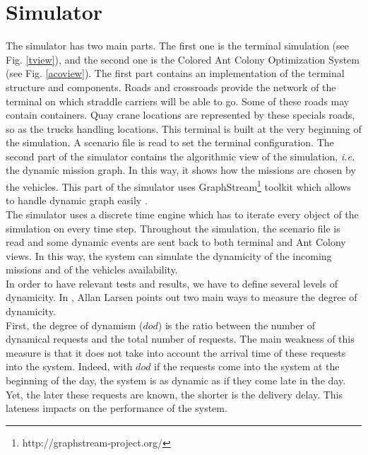 \documentclass[journal]{IEEEtran}
\begin{document}
\section{Simulator}
The simulator has two main parts. The first one is the terminal simulation (see
Fig. \ref{tview}), and the second one is the Colored Ant Colony Optimization
System (see Fig. \ref{acoview}).
The first part contains an implementation of the terminal structure and
components. Roads and crossroads provide the network of the terminal on which
straddle carriers will be able to go. Some of these roads may contain
containers. Quay crane locations are represented by these specials roads, so as
the trucks handling locations. This terminal is built at the very beginning of
the simulation. A scenario file is read to set the terminal configuration.
The second part of the simulator contains the algorithmic view of the
simulation, \textit{i.e.} the dynamic mission graph. In this way, it shows how
the missions are chosen by the vehicles. This part of the simulator uses
GraphStream\footnote{http://graphstream-project.org/} toolkit which allows to
handle dynamic graph easily \cite{Dutot2007}.\\

The simulator uses a discrete time engine which has to iterate every object of the
simulation on every time step. Throughout the simulation, the scenario file is
read and some dynamic events are sent back to both terminal and Ant Colony
views. In this way, the system can simulate the dynamicity %
of the incoming missions and of the vehicles availability.\\

In order to have relevant tests and results, we have to define several levels of
dynamicity. In \cite{larsen00}, Allan Larsen points out two main ways to measure the degree of dynamicity.\\

First, the degree of dynamism ($dod$) \cite{Lund96} is the ratio between
the number of dynamical requests and the total number of requests. The main weakness of this
measure is that it does not take  into account the arrival time of these
requests into the system. Indeed, with $dod$ if the requests come into the
system at the beginning of the day, the system is as dynamic as if they come
late in the day. Yet, the later these requests are known, the shorter is the
delivery delay. This lateness impacts on the performance of the system.\\
\end{document}
